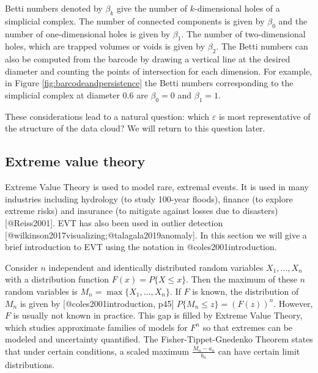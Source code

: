\documentclass[
]{article}
\begin{document}
Betti numbers denoted by \(\beta_k\) give the number of
\(k\)-dimensional holes of a simplicial complex. The number of connected
components is given by \(\beta_0\) and the number of one-dimensional
holes is given by \(\beta_1\). The number of two-dimensional holes,
which are trapped volumes or voids is given by \(\beta_2\). The Betti
numbers can also be computed from the barcode by drawing a vertical line
at the desired diameter and counting the points of intersection for each
dimension. For example, in Figure \ref{fig:barcodeandpersistence} the
Betti numbers corresponding to the simplicial complex at diameter
\(0.6\) are \(\beta_0 = 0\) and \(\beta_1 = 1\).

These considerations lead to a natural question: which \(\varepsilon\)
is most representative of the structure of the data cloud? We will
return to this question later.

\hypertarget{subsec:evt}{%
\subsection{Extreme value theory}\label{subsec:evt}}

Extreme Value Theory is used to model rare, extremal events. It is used
in many industries including hydrology (to study 100-year floods),
finance (to explore extreme risks) and insurance (to mitigate against
losses due to disasters) {[}@Reiss2001{]}. EVT has also been used in
outlier detection {[}@wilkinson2017visualizing;@talagala2019anomaly{]}.
In this section we will give a brief introduction to EVT using the
notation in @coles2001introduction.

Consider \(n\) independent and identically distributed random variables
\(X_1, \dots, X_n\) with a distribution function
\(F(x) = P\{X \leq x\}\). Then the maximum of these \(n\) random
variables is \(M_n = \max \{X_1, \dots, X_n\}\). If \(F\) is known, the
distribution of \(M_n\) is given by {[}@coles2001introduction, p45{]}
\(P\{M_n \leq z \} = \left(F(z)\right)^n\). However, \(F\) is usually
not known in practice. This gap is filled by Extreme Value Theory, which
studies approximate families of models for \(F^n\) so that extremes can
be modeled and uncertainty quantified. The Fisher-Tippet-Gnedenko
Theorem states that under certain conditions, a scaled maximum
\(\frac{M_n - a_n}{b_n}\) can have certain limit distributions.
\end{document}
